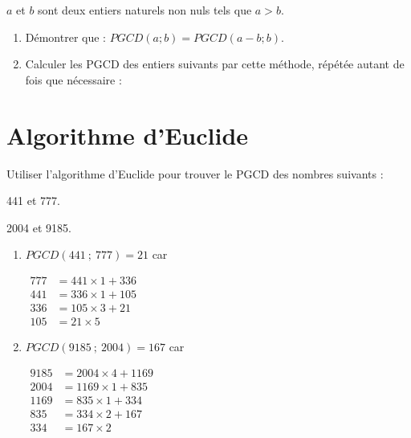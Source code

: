 \documentclass{cornouaille}
\begin{document}
\begin{exercice}
  $a$ et $b$ sont deux entiers naturels non nuls tels que
  $a>b$.

\begin{enumerate}
\item Démontrer que : $PGCD(a;b)=PGCD(a-b ; b)$.
\item Calculer les PGCD des entiers suivants par cette méthode, répétée autant de fois que nécessaire :

\end{enumerate}
\end{exercice}

\section{Algorithme d'Euclide}

\begin{exercice}[]
  
  Utiliser l'algorithme d'Euclide pour trouver le PGCD des nombres
  suivants :
\begin{colenumerate}{2}
\item 441 et 777. 
\item 2004 et 9185.
\end{colenumerate}
\end{exercice}
\begin{solution}
  \begin{enumerate}
\item $PGCD(441\ ;\ 777)=21$ car

$\begin{aligned}
777&=441\times1+336\\
441&=336\times1+105\\
336&=105\times3+21\\
105&=21\times5\end{aligned}$\medskip

\item $PGCD(9185\ ;\ 2004)=167$ car

$\begin{aligned}
9185&=2004\times4+1169\\
2004&=1169\times1+835\\
1169&=835\times1+334\\
835&=334\times2+167\\
334&=167\times2\end{aligned}$
\end{enumerate}
\end{solution}
\end{document}
